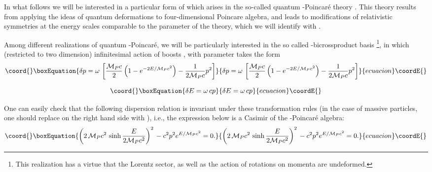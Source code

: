 \documentclass [11pt] {article}
\begin{document}
 In what follows we will be
interested in a particular form of \coordHE{} which arises in the so-called 
quantum \myHighlight{$\kappa$}\coordHE{}-Poincar\'{e} theory \cite{lunoruto, maru, luruto, luruza}.
This theory  results from applying the ideas of quantum deformations to 
four-dimensional Poincare algebra, and leads to modifications of 
relativistic symmetries at the energy scales comparable to the \myHighlight{$\kappa$}\coordHE{} 
parameter of the theory, which we will identify with \coordHE{}. 



 Among different
realizations of quantum \myHighlight{$\kappa$}\coordHE{}-Poincar\'{e}, we will be particularly
interested in the so called \myHighlight{$+$}\coordHE{}-bicrossproduct basis \cite{maru, 
luruza}\footnote{This realization has a virtue that the Lorentz sector, as
well as the action of rotations on momenta are undeformed.}, in which 
(restricted to two dimension) infinitesimal action of boosts \coordHE{}, with 
parameter \myHighlight{$\omega$}\coordHE{} takes the form 
\begin{equation}\coord{}\boxEquation{\label{a}
 \delta p = \omega\,\left[\frac{{\cal M}_P c}{2} \left( 1 - e^{-2 E/{\cal M}_P
 c^2}\right) - \frac{1}{2{\cal M}_P c} p^2\right]
}{\delta p = \omega\,\left[\frac{{\cal M}_P c}{2} \left( 1 - e^{-2 E/{\cal M}_P
 c^2}\right) - \frac{1}{2{\cal M}_P c} p^2\right]
}{ecuacion}\coordE{}\end{equation}

\begin{equation}\coord{}\boxEquation{\label{b}
\delta E = \omega\, c p
}{\delta E = \omega\, c p
}{ecuacion}\coordE{}\end{equation}

One can easily check that the following dispersion relation  is invariant 
under these transformation rules (in the case of massive particles, one 
should replace \coordHE{} on  the right hand side with \coordHE{}), i.e., the 
expression below is a Casimir of the \myHighlight{$\kappa$}\coordHE{}-Poincar\'{e} algebra: 
\begin{equation}\coord{}\boxEquation{\label{4}
 \left(2\,{\cal M}_P c^2\,\sinh \frac{E}{2{\cal M}_P
 c^2}\right)^2\,
  -c^2p^2 e^{E/{\cal M}_Pc^2} =0.
}{\left(2\,{\cal M}_P c^2\,\sinh \frac{E}{2{\cal M}_P
 c^2}\right)^2\,
  -c^2p^2 e^{E/{\cal M}_Pc^2} =0.
}{ecuacion}\coordE{}\end{equation}
\end{document}
